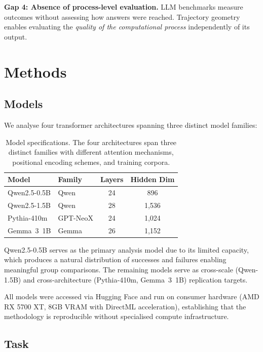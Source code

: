 \documentclass[11pt,twocolumn]{article}
\begin{document}
\textbf{Gap 4: Absence of process-level evaluation.} LLM benchmarks measure outcomes without assessing how answers were reached. Trajectory geometry enables evaluating the \emph{quality of the computational process} independently of its output.


\section{Methods}
\label{sec:methods}

\subsection{Models}
\label{sec:models}

We analyse four transformer architectures spanning three distinct model families:

\begin{table}[h]
\centering
\small
\begin{tabular}{llcc}
\toprule
\textbf{Model} & \textbf{Family} & \textbf{Layers} & \textbf{Hidden Dim} \\
\midrule
Qwen2.5-0.5B & Qwen & 24 & 896 \\
Qwen2.5-1.5B & Qwen & 28 & 1,536 \\
Pythia-410m & GPT-NeoX & 24 & 1,024 \\
Gemma~3~1B & Gemma & 26 & 1,152 \\
\bottomrule
\end{tabular}
\caption{Model specifications. The four architectures span three distinct families with different attention mechanisms, positional encoding schemes, and training corpora.}
\label{tab:models}
\end{table}

Qwen2.5-0.5B serves as the primary analysis model due to its limited capacity, which produces a natural distribution of successes and failures enabling meaningful group comparisons. The remaining models serve as cross-scale (Qwen-1.5B) and cross-architecture (Pythia-410m, Gemma~3~1B) replication targets.

All models were accessed via Hugging Face and run on consumer hardware (AMD RX 5700 XT, 8GB VRAM with DirectML acceleration), establishing that the methodology is reproducible without specialised compute infrastructure.

\subsection{Task}
\end{document}
